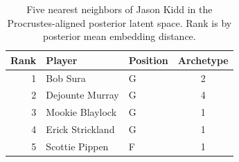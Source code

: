 \begin{table}[htbp]
  \centering\small
  \begin{tabular}{rllc}
    \toprule
    Rank & Player & Position & Archetype \\
    \midrule
    1 & Bob Sura & G & 2 \\
    2 & Dejounte Murray & G & 4 \\
    3 & Mookie Blaylock & G & 1 \\
    4 & Erick Strickland & G & 1 \\
    5 & Scottie Pippen & F & 1 \\
    \bottomrule
  \end{tabular}
  \caption{Five nearest neighbors of Jason Kidd in the Procrustes-aligned posterior latent space. Rank is by posterior mean embedding distance.}
  \label{tab:Jason_Kidd_neighbors}
\end{table}

